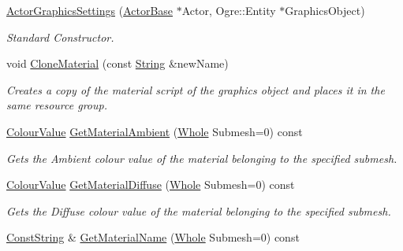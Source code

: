 \begin{DoxyCompactItemize}
\item 
\hyperlink{classMezzanine_1_1ActorGraphicsSettings_ac9e5523fb884b7302e0e24a5d5f0e241}{ActorGraphicsSettings} (\hyperlink{classMezzanine_1_1ActorBase}{ActorBase} $\ast$Actor, Ogre::Entity $\ast$GraphicsObject)
\begin{DoxyCompactList}\small\item\em Standard Constructor. \item\end{DoxyCompactList}\item 
void \hyperlink{classMezzanine_1_1ActorGraphicsSettings_aa2e7c7e9fb2c50dd3d4470dbde7da9d2}{CloneMaterial} (const \hyperlink{namespaceMezzanine_acf9fcc130e6ebf08e3d8491aebcf1c86}{String} \&newName)
\begin{DoxyCompactList}\small\item\em Creates a copy of the material script of the graphics object and places it in the same resource group. \item\end{DoxyCompactList}\item 
\hyperlink{classMezzanine_1_1ColourValue}{ColourValue} \hyperlink{classMezzanine_1_1ActorGraphicsSettings_a6763d4efae125b9094dab6064f9a07a4}{GetMaterialAmbient} (\hyperlink{namespaceMezzanine_adcbb6ce6d1eb4379d109e51171e2e493}{Whole} Submesh=0) const 
\begin{DoxyCompactList}\small\item\em Gets the Ambient colour value of the material belonging to the specified submesh. \item\end{DoxyCompactList}\item 
\hyperlink{classMezzanine_1_1ColourValue}{ColourValue} \hyperlink{classMezzanine_1_1ActorGraphicsSettings_a2ec82f733a81cf3f3ec3a6d1fbd9f62f}{GetMaterialDiffuse} (\hyperlink{namespaceMezzanine_adcbb6ce6d1eb4379d109e51171e2e493}{Whole} Submesh=0) const 
\begin{DoxyCompactList}\small\item\em Gets the Diffuse colour value of the material belonging to the specified submesh. \item\end{DoxyCompactList}\item 
\hyperlink{namespaceMezzanine_a63cd699ac54b73953f35ec9cfc05e506}{ConstString} \& \hyperlink{classMezzanine_1_1ActorGraphicsSettings_a96376827aab2abf489a7ae52bf2eba5b}{GetMaterialName} (\hyperlink{namespaceMezzanine_adcbb6ce6d1eb4379d109e51171e2e493}{Whole} Submesh=0) const 

\end{DoxyCompactItemize}

